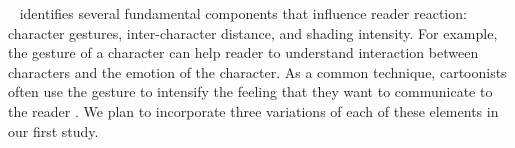 ~\textcite{scott1993understanding} identifies several fundamental components that influence reader reaction: character gestures, inter-character distance, and shading intensity. For example, the gesture of a character can help reader to understand interaction between characters and the emotion of the character. As a common technique, cartoonists often use the gesture to intensify the feeling that they want to communicate to the reader \cite{scott1993understanding}.
We plan to incorporate three variations of each of these elements in our first study.



